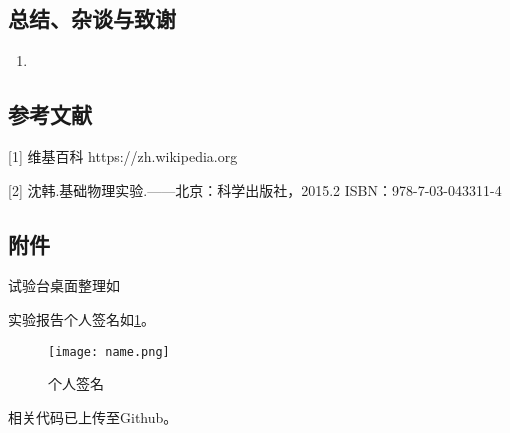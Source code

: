 \documentclass[dvipsnames, svgnames,a4paper,11pt]{article}
\begin{document}
	\subsection{总结、杂谈与致谢}
	\begin{enumerate}
		\item 
	\end{enumerate}
	
	\subsection{参考文献}
	[1] 维基百科 https://zh.wikipedia.org
	
	[2] 沈韩.基础物理实验.——北京：科学出版社，2015.2 ISBN：978-7-03-043311-4
	
	
	\subsection{附件}
	试验台桌面整理如%
	
	实验报告个人签名如\cref{fig:name}。
	
	\begin{figure}[htbp]
		\centering
		\texttt{[image: name.png]}
		\caption{个人签名}
		\label{fig:name}
	\end{figure}
	
	
	相关代码已上传至Github。
	
	
	
\end{document}
